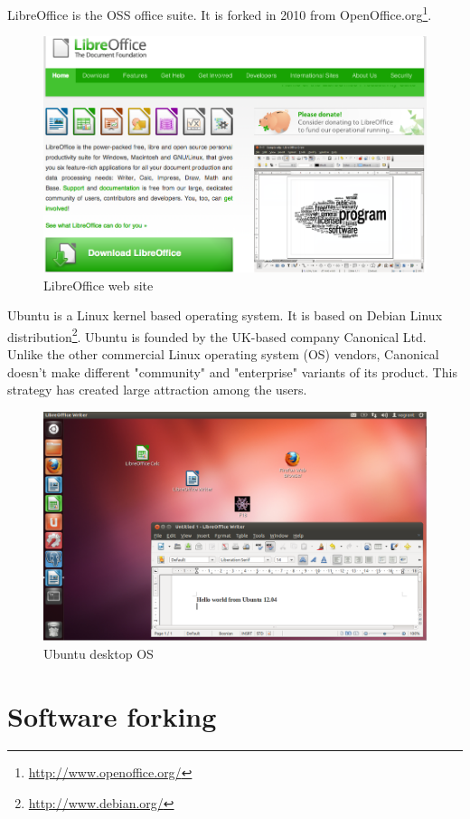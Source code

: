 \documentclass[times, utf8, seminar]{fit}
\begin{document}
LibreOffice is the OSS office suite. It is forked in 2010 from OpenOffice.org\footnote{\url{http://www.openoffice.org/}}.

\begin{figure}[H]
\centering
\includegraphics[width=12cm]{img/libre_web.png}
\caption{LibreOffice web site}
\end{figure}

Ubuntu is a Linux kernel based operating system. It is based on Debian Linux distribution\footnote{\url{http://www.debian.org/}}. Ubuntu is founded by the UK-based company Canonical Ltd. Unlike the other commercial Linux operating system (OS) vendors, Canonical doesn't make different "community" and "enterprise" variants of its product. This strategy has created large attraction among the users.   

\begin{figure}[H]
\centering
\includegraphics[width=12cm]{img/ubuntu_desktop.png}
\caption{Ubuntu desktop OS}
\end{figure}


\section{Software forking}
\end{document}
